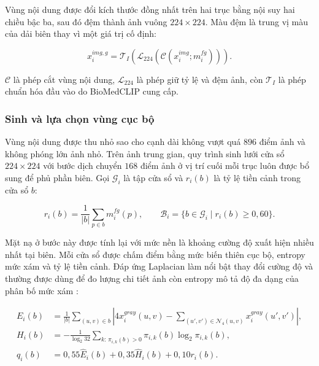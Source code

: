 Vùng nội dung được đổi kích thước đồng nhất trên hai trục bằng nội suy hai chiều bậc ba, sau đó đệm thành ảnh vuông $224\times224$. Màu đệm là trung vị màu của dải biên thay vì một giá trị cố định:

\begin{equation}
x_i^{img,g}
=\mathcal{T}_{I}\!\left(
\mathcal{L}_{224}\!\left(
\mathcal{C}\!\left(x_i^{img};m_i^{fg}\right)
\right)
\right).
\label{eq:ch3_global_image}
\end{equation}

$\mathcal{C}$ là phép cắt vùng nội dung, $\mathcal{L}_{224}$ là phép giữ tỷ lệ và đệm ảnh, còn $\mathcal{T}_{I}$ là phép chuẩn hóa đầu vào do BioMedCLIP cung cấp.

\subsubsection{Sinh và lựa chọn vùng cục bộ}

Vùng nội dung được thu nhỏ sao cho cạnh dài không vượt quá $896$ điểm ảnh và không phóng lớn ảnh nhỏ. Trên ảnh trung gian, quy trình sinh lưới cửa sổ $224\times224$ với bước dịch chuyển $168$ điểm ảnh ở vị trí cuối mỗi trục luôn được bổ sung để phủ phần biên. Gọi $\mathcal{G}_i$ là tập cửa sổ và $r_i(b)$ là tỷ lệ tiền cảnh trong cửa sổ $b$:

\begin{equation}
r_i(b)=\frac{1}{|b|}\sum_{p\in b}m_i^{fg}(p),
\qquad
\mathcal{B}_i=\{b\in\mathcal{G}_i\mid r_i(b)\geq0{,}60\}.
\label{eq:ch3_candidate_regions}
\end{equation}

Mặt nạ ở bước này được tính lại với mức nền là khoảng cường độ xuất hiện nhiều nhất tại biên. Mỗi cửa sổ được chấm điểm bằng mức biến thiên cục bộ, entropy mức xám và tỷ lệ tiền cảnh. Đáp ứng Laplacian làm nổi bật thay đổi cường độ \cite{Marr1980EdgeDetection} và thường được dùng để đo lượng chi tiết ảnh \cite{Pertuz2013FocusMeasures} còn entropy mô tả độ đa dạng của phân bố mức xám \cite{Shannon1948Information}:

\begin{equation}
\begin{aligned}
E_i(b)
&=\frac{1}{|b|}\sum_{(u,v)\in b}
\left|4x_i^{gray}(u,v)-\!\sum_{(u',v')\in\mathcal{N}_4(u,v)}
x_i^{gray}(u',v')\right|,\\
H_i(b)
&=-\frac{1}{\log_2 32}
\sum_{k:\,\pi_{i,k}(b)>0}\pi_{i,k}(b)\log_2\pi_{i,k}(b),\\
q_i(b)
&=0{,}55\widehat{E}_i(b)+0{,}35\widehat{H}_i(b)+0{,}10r_i(b).
\end{aligned}
\label{eq:ch3_candidate_score}
\end{equation}

